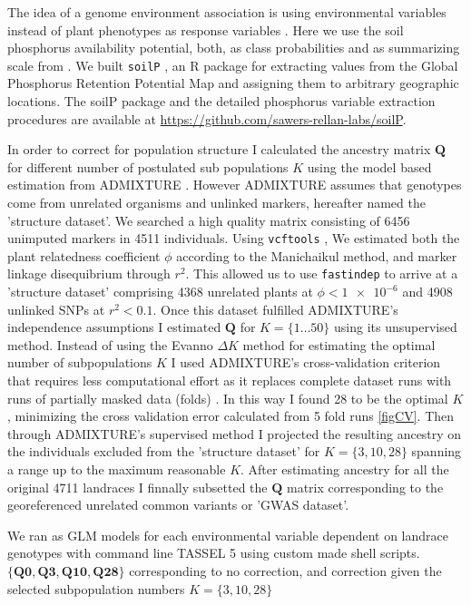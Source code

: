 \documentclass[9pt,twocolumn,twoside,lineno]{gsajnl}
\begin{document}
The idea of a genome environment association is using environmental variables instead  of plant phenotypes as response variables \cite{lasky2015}. Here we use the soil phosphorus availability potential, both, as class probabilities and as summarizing scale from \cite{batjes2011}. We built \texttt{soilP} \cite{rodriguez-zapata2018}, an R package for extracting values from the Global Phosphorus Retention Potential Map and assigning them to arbitrary geographic locations. The soilP package and the detailed phosphorus variable extraction procedures are available at \url{https://github.com/sawers-rellan-labs/soilP}.


In order to correct for population structure I calculated the ancestry matrix $\mathbf{Q}$ for different number of postulated sub populations $K$ using the model based estimation from ADMIXTURE \cite{alexander2009}. However ADMIXTURE assumes that genotypes come from unrelated organisms and unlinked markers, hereafter named the 'structure dataset'. 
We searched a high quality matrix consisting of 6456 unimputed markers in 4511 individuals. 
Using \texttt{vcftools} \cite{danecek2011}, We estimated both the plant relatedness coefficient $\phi$  according to the Manichaikul \cite{manichaikul2010} method,  and marker linkage disequibrium through $r^2$. This allowed us to use \texttt{fastindep} \cite{abraham2014} to arrive at a 'structure dataset' comprising 4368 unrelated plants at $\phi < \num{1e-6}$ and 4908 unlinked SNPs at $r^2 < 0.1$. 
Once this dataset fulfilled  ADMIXTURE's independence assumptions I estimated $\mathbf{Q}$ for $K = \{1 \ldots 50\}$ using its unsupervised method. Instead of using the Evanno $\Delta K$ method \cite{evanno2005}  for estimating the optimal number of subpopulations $K$ I used  ADMIXTURE's cross-validation criterion that requires less computational effort as it replaces complete dataset runs with runs of partially masked data (folds) \cite{alexander2009,lawson2018}.
In this way I found  28 to be the optimal $K$, minimizing the cross validation error calculated from 5 fold runs \ref{figCV}. Then through ADMIXTURE's supervised method I projected the resulting ancestry on the individuals excluded from the 'structure dataset' for $K = \{3,10,28\}$  spanning a range up to the maximum reasonable $K$. 
After estimating ancestry for all the original 4711 landraces I finnally subsetted the $\mathbf{Q}$ matrix corresponding to the georeferenced unrelated common variants or 'GWAS dataset'. 

We ran as GLM models for each environmental variable  dependent on landrace genotypes with command line TASSEL 5 \cite{bradbury2007} using custom made shell scripts. $\mathbf{\{Q0, Q3, Q10, Q28\}}$ corresponding to no correction, and correction given the selected subpopulation numbers $K = \{3,10,28\}$ 
\end{document}
